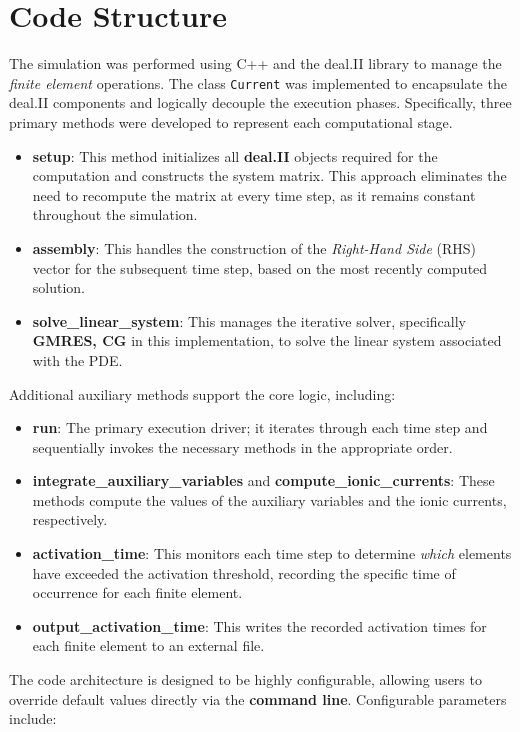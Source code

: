 \documentclass{Configuration_Files/PoliMi3i_thesis}
\begin{document}
\section{Code Structure}

The simulation was performed using C++ and the deal.II library to manage the \textit{finite element} operations. The class \texttt{Current} was implemented to encapsulate the deal.II components and logically decouple the execution phases. Specifically, three primary methods were developed to represent each computational stage.


\begin{itemize}
\item \textbf{setup}: This method initializes all \textbf{deal.II} objects required for the computation and constructs the system matrix. This approach eliminates the need to recompute the matrix at every time step, as it remains constant throughout the simulation.
\item \textbf{assembly}: This handles the construction of the \textit{Right-Hand Side} (RHS) vector for the subsequent time step, based on the most recently computed solution.
\item \textbf{solve\_linear\_system}: This manages the iterative solver, specifically \textbf{GMRES, CG} in this implementation, to solve the linear system associated with the PDE.
\end{itemize}

Additional auxiliary methods support the core logic, including:

\begin{itemize}
\item \textbf{run}: The primary execution driver; it iterates through each time step and sequentially invokes the necessary methods in the appropriate order.
\item \textbf{integrate\_auxiliary\_variables} and \textbf{compute\_ionic\_currents}: These methods compute the values of the auxiliary variables and the ionic currents, respectively.
\item \textbf{activation\_time}: This monitors each time step to determine \textit{which} elements have exceeded the activation threshold, recording the specific time of occurrence for each finite element.
\item \textbf{output\_activation\_time}: This writes the recorded activation times for each finite element to an external file.
\end{itemize}

The code architecture is designed to be highly configurable, allowing users to override default values directly via the \textbf{command line}. Configurable parameters include:
\end{document}
